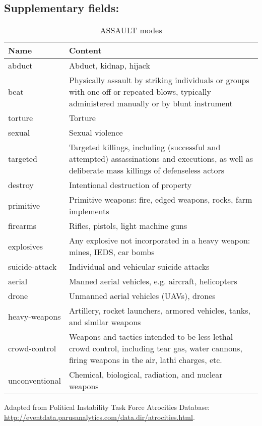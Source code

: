 \documentclass[11pt]{report}
\newcommand{\txt}[1]{\texttt{#1}}
\begin{document}
\subsection{Supplementary fields:}


\begin{table}[htp]
\caption{ASSAULT modes}
\begin{center}
\begin{tabular}{|p{}|p{}|}
\hline
Name & Content \\
\hline
abduct & Abduct, kidnap, hijack \\
beat & Physically assault by striking individuals or groups with one-off or repeated blows, typically administered manually or by blunt instrument\\
torture & Torture \\
sexual & Sexual violence\\
targeted & Targeted killings, including (successful and attempted) assassinations and executions, as well as deliberate mass killings of defenseless actors \\
destroy & Intentional destruction of property \\
primitive & Primitive weapons: fire, edged weapons, rocks, farm implements \\
firearms & Rifles, pistols, light machine guns\\
explosives & Any explosive not incorporated in a heavy weapon: mines, IEDS, car bombs \\
suicide-attack & Individual and vehicular suicide attacks \\
aerial & Manned aerial vehicles, e.g. aircraft, helicopters \\
drone & Unmanned aerial vehicles (UAVs), drones \\
heavy-weapons & Artillery, rocket launchers, armored vehicles, tanks, and similar weapons \\
crowd-control & Weapons and tactics intended to be less lethal crowd control, including tear gas, water cannons, firing weapons in the air, lathi charges, etc. \\
unconventional & Chemical, biological, radiation, and nuclear weapons  \\
\hline
\end{tabular}
\end{center}
\label{tab:violmode}
\raggedright{Adapted from Political Instability Task Force Atrocities Database: \url{http://eventdata.parusanalytics.com/data.dir/atrocities.html}}.
\end{table}%
\end{document}

